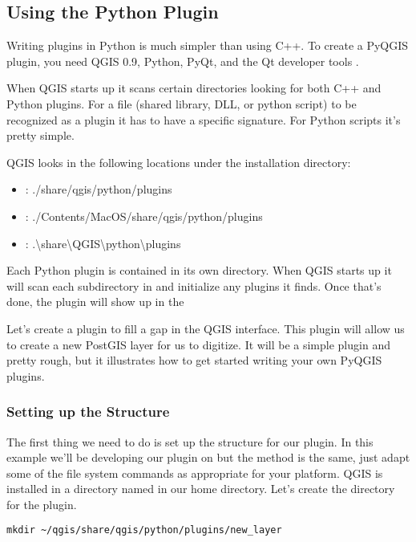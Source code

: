\subsection{Using the Python Plugin}

Writing plugins in Python is much simpler than using C++.
To create a PyQGIS plugin, you need QGIS 0.9, Python, PyQt, and the Qt developer tools \cite{sherman07}.

When QGIS starts up it scans certain directories looking for both C++ and Python plugins.
For a file (shared library, DLL, or python script) to be recognized as a plugin it has to have a specific signature.
For Python scripts it's pretty simple.

QGIS looks in the following locations under the installation directory:

\begin{itemize}
\item {}: ./share/qgis/python/plugins
\item {}: ./Contents/MacOS/share/qgis/python/plugins
\item {}: .\textbackslash share\textbackslash QGIS\textbackslash python\textbackslash plugins
\end{itemize}

Each Python plugin is contained in its own directory.
When QGIS starts up it will scan each subdirectory in  and initialize any plugins it finds.
Once that's done, the plugin will show up in the 

Let's create a plugin to fill a gap in the QGIS interface.
This plugin will allow us to create a new PostGIS layer for us to digitize.
It will be a simple plugin and pretty rough, but it illustrates how to get started writing your own PyQGIS plugins.

\subsubsection{Setting up the Structure}
The first thing we need to do is set up the structure for our plugin.
In this example we'll be developing our plugin on  but the method is the same, just adapt some of the file system commands as appropriate for your platform.
QGIS is installed in a directory named  in our home directory.
Let's create the directory for the plugin.

\begin{verbatim}
mkdir ~/qgis/share/qgis/python/plugins/new_layer
\end{verbatim}

